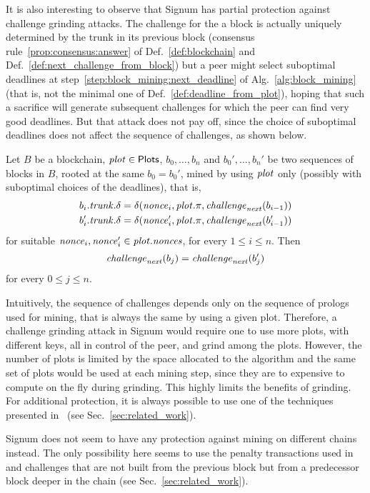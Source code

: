 It is also interesting to observe that Signum has partial protection
against challenge grinding attacks.
The challenge for the a block is actually uniquely determined by the trunk in its
previous block
(consensus rule~\ref{prop:consensus:answer} of Def.~\ref{def:blockchain}
and Def.~\ref{def:next_challenge_from_block}) but a peer
might select suboptimal deadlines at step~\ref{step:block_mining:next_deadline}
of Alg.~\ref{alg:block_mining} (that is, not the minimal one of Def.~\ref{def:deadline_from_plot}),
hoping that such a sacrifice will generate subsequent challenges for which the peer
can find very good deadlines.
But that attack does not pay off, since the choice of suboptimal deadlines does not
affect the sequence of challenges, as shown below.
%
\begin{proposition}\label{prop:no_challenge_grinding}
  Let $B$ be a blockchain, ${\mathit{plot}}\in{\mathsf{Plots}}$, $b_0,\ldots,b_n$ and
  $b_0',\ldots,b_n'$ be two sequences of blocks in $B$, rooted at the same
  $b_0=b_0'$, mined by using ${\mathit{plot}}$ only
  (possibly with suboptimal choices of the deadlines), that is,
  \begin{align*}
    b_i.{\mathit{trunk}}.\delta&=\delta({\mathit{nonce}}_i,{\mathit{plot}}.\pi,{\mathit{challenge}}_{\mathit{next}}(b_{i-1}))\\
    b'_i.{\mathit{trunk}}.\delta&=\delta({\mathit{nonce}}'_i,{\mathit{plot}}.\pi,{\mathit{challenge}}_{\mathit{next}}(b'_{i-1}))
  \end{align*}
  for suitable ${\mathit{nonce}}_i,{\mathit{nonce}}_i'\in{\mathit{plot}}.{\mathit{nonces}}$, for every $1\le i\le n$. Then
  \[
  {\mathit{challenge}}_{\mathit{next}}(b_j)={\mathit{challenge}}_{\mathit{next}}(b'_j)
  \]
  for every $0\le j\le n$.
\end{proposition}
%
Intuitively, the sequence of challenges depends only on
the sequence of prologs used for mining, that is always the same by using a given plot.
Therefore, a challenge grinding attack in Signum
would require one to use more plots, with different keys, all in control of the peer,
and grind among the plots. However, the number of plots is limited by the space
allocated to the algorithm and the same set of plots
would be used at each mining step, since they are to expensive to compute
on the fly during grinding. This highly
limits the benefits of grinding. For additional protection, it is always possible to use
one of the techniques presented in~\cite{ParkKFGAP18} (see Sec.~\ref{sec:related_work}).

Signum does not seem to have any protection against mining on different chains instead.
The only possibility here seems to use the penalty transactions used in~\cite{ParkKFGAP18}
and challenges that
are not built from the previous block but from a predecessor block deeper in the chain
(see Sec.~\ref{sec:related_work}).

